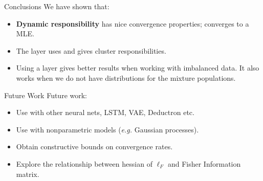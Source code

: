 \documentclass{beamer}
\begin{document}
	\begin{frame}{Conclusions}
		We have shown that:
		\begin{itemize}
			\item \textbf{Dynamic responsibility} has nice convergence properties; converges to a MLE.
			\item The \textbf{\RS} layer uses \DR and gives cluster responsibilities.
			\item Using a \RS layer gives better results when working with imbalanced data. It also works when we do not have distributions for the mixture populations.
		\end{itemize}
	\end{frame}

	\begin{frame}{Future Work}
		Future work:
		\begin{itemize}
			\item Use \RS with other neural nets, LSTM, VAE, Deductron etc.
			\item Use \RS with nonparametric models (\textit{e.g.} Gaussian processes).
			\item Obtain constructive bounds on convergence rates.
			\item Explore the relationship between hessian of \( \ell_F \) and Fisher Information matrix.
		\end{itemize}
	\end{frame}
	
\end{document}
